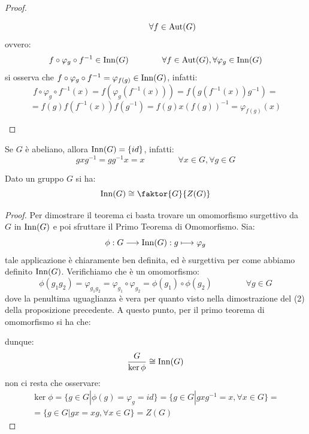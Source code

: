 \documentclass[11pt]{scrartcl}
\begin{document}
\begin{proof}
\begin{enumerate}[(1)]
\[                    \qquad \qquad \forall f \in \operatorname{Aut}(G)
                        \]
                ovvero:
                    \[ f \circ \varphi_g \circ f^{-1} \in \operatorname{Inn}(G)
                    \qquad \qquad \forall f \in \operatorname{Aut}(G), \forall \varphi_g \in \operatorname{Inn}(G)
                        \]
                si osserva che $f \circ \varphi_g \circ f^{-1} = \varphi_{f(g)} \in \operatorname{Inn}(G)$, infatti:
                    \[ f \circ \varphi_g \circ f^{-1} (x) = f(\varphi_g(f^{-1} (x))) = f(g(f^{-1}(x))g^{-1}) =
                        \]\[ = f(g) f(f^{-1}(x)) f(g^{-1}) = f(g) x (f(g))^{-1} = \varphi_{f(g)}(x)
                            \]
        \end{enumerate}
\end{proof}

\begin{remark}
    Se $G$ è abeliano, allora $\operatorname{Inn}(G) = \{id\}$, infatti:
        \[ gxg^{-1} = gg^{-1}x = x \qquad \qquad \forall x \in G, \forall g \in G
            \]
\end{remark}

\begin{proposition}
    Dato un gruppo $G$ si ha:
    \[\Inn(G) \cong \faktor{G}{Z(G)}\]
\end{proposition}

\begin{proof}
    Per dimostrare il teorema ci basta trovare un omomorfismo surgettivo da $G$ in $\operatorname{Inn}(G)$ e poi sfruttare il Primo Teorema di Omomorfismo. Sia:
        \[ \phi : G \longrightarrow \operatorname{Inn}(G) : g \longmapsto \varphi_g
            \]
    tale applicazione è chiaramente ben definita, ed è surgettiva per come abbiamo definito $\operatorname{Inn}(G)$. Verifichiamo che è un omomorfismo:
        \[ \phi(g_1g_2) = \varphi_{g_1g_2} = \varphi_{g_1} \circ \varphi_{g_2} = \phi(g_1) \circ \phi(g_2)
        \qquad \qquad \forall g \in G
            \]
        dove la penultima uguaglianza è vera per quanto visto nella dimostrazione del (2) della proposizione precedente. A questo punto, per il 
        primo teorema di omomorfismo si ha che:
            \begin{center}
            \end{center}
        dunque:
            \[ \frac{G}{\ker{\phi}} \cong \operatorname{Inn}(G)
                \]
        non ci resta che osservare:
            \begin{multline*}
                \ker{\phi} = \{g \in G | \phi(g) = \varphi_g = id\} = \{g \in G | gxg^{-1} = x, \forall x \in G\} = \\ 
                = \{g \in G | gx = xg, \forall x \in G\} = Z(G)
            \end{multline*}
\end{proof}
\end{document}
